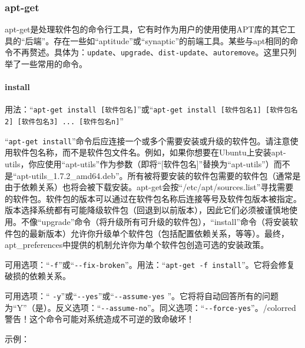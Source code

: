 \subsubsection{apt-get}
\cite{manaptget}\par
apt-get是处理软件包的命令行工具，它有时作为用户的使用使用APT库的其它工具的“后端”。存在一些如“aptitude”或“synaptic”的前端工具。某些与apt相同的命令不再赘述。具体为：\verb|update|、\verb|upgrade|、\verb|dist-update|、\verb|autoremove|。这里只列举了一些常用的命令。\par
\paragraph{install}
用法：“\verb|apt-get install [软件包名]|”或“\verb|apt-get install [软件包名1] [软件包名2] [软件包名3] ... [软件包名n]|”\par
“\verb|apt-get install|”命令后应连接一个或多个需要安装或升级的软件包。请注意使用软件包名称，而不是软件包文件名。例如，如果你想要在Ubuntu上安装apt-utils，你应使用“apt-utils”作为参数（即将“[软件包名]”替换为“apt-utils”）而不是“apt-utils\_1.7.2\_amd64.deb”。所有被将要安装的软件包需要的软件包（通常是由于依赖关系）也将会被下载安装。apt-get会按“/etc/apt/sources.list”寻找需要的软件包。软件包的版本可以通过在软件包名称后连接等号及软件包版本被指定。版本选择系统都有可能降级软件包（回退到以前版本），因此它们必须被谨慎地使用。不像“upgrade”命令（将升级所有可升级的软件包），“install”命令（将安装软件包的最新版本）允许你升级单个软件包（包括配置依赖关系，等等）。最终，apt\_preferences中提供的机制允许你为单个软件包创造可选的安装政策。\par
可用选项：“\verb|-f|”或“\verb|--fix-broken|”。用法：“\verb|apt-get -f install|”。它将会修复破损的依赖关系。\par
可用选项：“ \verb|-y|”或“\verb|--yes|”或“\verb|--assume-yes| ”。它将将自动回答所有的问题为“Y”（是）。反义选项：“\verb|--assume-no|”。同义选项：“\verb|--force-yes|”。{/color{red}警告！这个命令可能对系统造成不可逆的致命破坏！}\par
示例：
